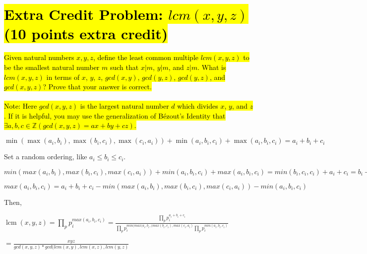\documentclass[12pt]{article}
\def\lcm{{\operatorname{lcm}}}             %
\begin{document}
\section*{\hl{Extra Credit Problem: $lcm(x,y,z)$ (10 points extra credit)}}
\hl{Given natural numbers $x,y,z$, define the least common multiple $lcm(x,y,z)$ to be 
the smallest natural number $m$ such that $x | m$, $y | m$, and $z | m$. What is 
$lcm(x,y,z)$ in terms of $x$, $y$, $z$, $gcd(x,y)$, $gcd(y,z)$, $gcd(y,z)$, and 
$gcd(x,y,z)$? Prove that your answer is correct.\\
\\
Note: Here $gcd(x,y,z)$ is the largest natural number $d$ which divides $x$, $y$, 
and $z$. If it is helpful, you may use the generalization of B\'{e}zout's Identity 
that $\exists a,b,c \in \mathbb{Z} (gcd(x,y,z) = ax + by + cz)$.}\\

\item $\min(\max(a_i,b_i),\max(b_i,c_i),\max(c_i,a_i))+\min(a_i,b_i,c_i)+\max(a_i,b_i,c_i)=a_i+b_i+c_i$\\

\item Set a random ordering, like $a_i \leq b_i \leq c_i$. 
\item $min(max(a_i,b_i),max(b_i,c_i),max(c_i,a_i))+min(a_i,b_i,c_i)+max(a_i,b_i,c_i)=min(b_i,c_i,c_i)+a_i+c_i=b_i+a_i+c_i=a_i+b_i+c_i.$\\
\item $max(a_i,b_i,c_i)=a_i+b_i+c_i−min(max(a_i,b_i),max(b_i,c_i),max(c_i,a_i))−min(a_i,b_i,c_i)$
\item Then,
\item $\lcm(x,y,z) = \prod_{p} p_{i}^{max(a_i, b_i, c_i)} = \frac{\prod_{p} p_{i}^{a_i+b_i+c_i}}{\prod_{p} p_{i}^{min(max(a_i, b_i, (max(b_i, c_i), max(c_i, a_i)}\prod_{p} p_{i}^{min(a_i,b_i,c_i)}} $\;
\begin{center}
\item $= \frac{xyz}{gcd(x,y,z)*gcd(lcm(x,y),lcm(x,z),lcm(y,z)}$
\end{center}
\end{document}
